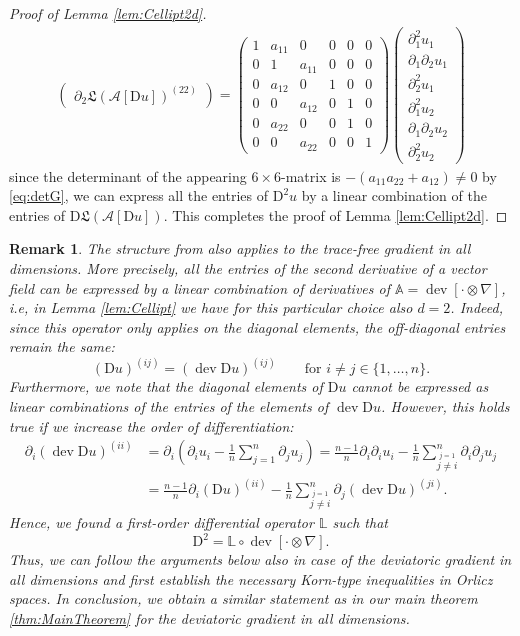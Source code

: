 \documentclass[a4paper,10pt,reqno,oneside]{amsart}
\numberwithin{equation}{section}
\newcommand{\A}{\mathscr{A}}
\newcommand{\Aop}{\mathbb{A}}
\newcommand{\D}{\mathrm{D}}
\newcommand{\dev}{\operatorname{dev}}
\newtheorem{rem}[thm]{Remark}
\begin{document}
\begin{proof}[Proof of Lemma \ref{lem:Cellipt2d}]
\begin{align*}
\begin{pmatrix}
  \partial_2 \mathfrak{L}(\A[\D u])^{(22)}
 \end{pmatrix}
 =
 \begin{pmatrix}
  1 & a_{11} & 0 & 0 & 0 & 0\\
  0 & 1 & a_{11} & 0 & 0 & 0\\
  0 & a_{12} & 0 & 1 & 0 & 0\\
  0 & 0 & a_{12} & 0 & 1 & 0\\
  0 & a_{22} & 0 & 0 & 1 & 0\\
  0 & 0 & a_{22} & 0 & 0 & 1
 \end{pmatrix}
 \begin{pmatrix}
  \partial_1^2 u_1\\
  \partial_1\partial_2 u_1 \\
  \partial_2^2u_1\\
  \partial_1^2 u_2\\
  \partial_1\partial_2 u_2 \\
  \partial_2^2u_2
 \end{pmatrix}
\end{align*}
since the determinant of the appearing $6\times6$-matrix is $-(a_{11}a_{22}+a_{12})\neq0$ by \eqref{eq:detG}, we can express all the entries of $\D^2 u$ by a linear combination of the entries of $\D\mathfrak{L}(\A[\D u])$. This completes the proof of Lemma \ref{lem:Cellipt2d}.
 \end{proof}
\begin{rem}\label{rem:dev2}
 The structure from  also applies to the trace-free gradient in all dimensions. More precisely, all the entries of the second derivative of a vector field can be expressed by a linear combination of derivatives of $\Aop=\dev[\cdot\otimes\nabla]$, i.e, in Lemma \ref{lem:Cellipt} we have for this particular choice also $d=2$. Indeed, since this operator only applies on the diagonal elements, the off-diagonal entries remain the same:
 \[
  (\D u)^{(ij)}=(\dev \D u)^{(ij)} \qquad \text{for }i\neq j \in\{1,\ldots,n\}.
 \]
Furthermore, we note that the diagonal elements of $\D u$ cannot be expressed as linear combinations of the entries of the elements of $\dev \D u$. However, this holds true if we increase the order of differentiation:
\begin{align*}
 \partial_i(\dev\D u)^{(ii)}&=\partial_i\left(\partial_i u_i -\frac1n\sum_{j=1}^n\partial_ju_j\right)=\frac{n-1}{n}\partial_i\partial_i u_i -\frac1n\sum_{\stackrel{j=1}{j\neq i}}^n\partial_i\partial_j u_j\\
 &= \frac{n-1}{n}\partial_i(\D u)^{(ii)}-\frac1n\sum_{\stackrel{j=1}{j\neq i}}^n\partial_j(\dev \D u)^{(ji)}.
\end{align*}
Hence, we found a first-order differential operator $\mathbb{L}$ such that
\[
 \D^2 = \mathbb{L}\circ \dev[\cdot\otimes\nabla].
\]
Thus, we can follow the arguments below also in case of the deviatoric gradient in all dimensions and first establish the necessary Korn-type inequalities in Orlicz spaces. In conclusion, we obtain a similar statement as in our main theorem \ref{thm:MainTheorem} for the deviatoric gradient in all dimensions.

\end{rem}
\end{document}
